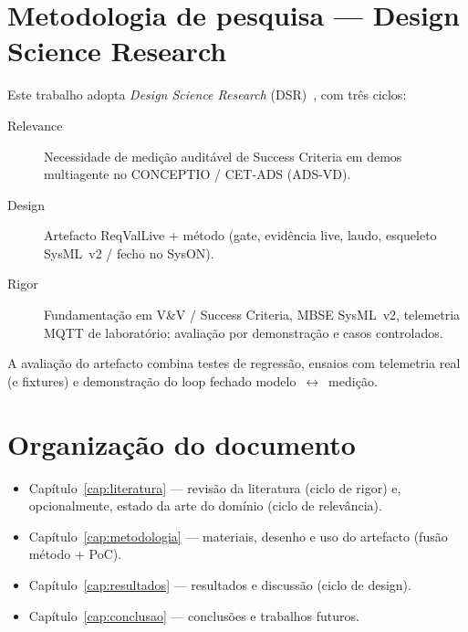 \section{Metodologia de pesquisa --- Design Science Research}
\label{sec:dsr}

Este trabalho adopta \emph{Design Science Research} (DSR)~\cite{hevner2004},
com três ciclos:

\begin{description}
  \item[Relevance] Necessidade de medição auditável de Success Criteria em demos
        multiagente no CONCEPTIO / CET-ADS (ADS-VD).
  \item[Design] Artefacto ReqValLive + método (gate, evidência live, laudo,
        esqueleto SysML~v2 / fecho no SysON).
  \item[Rigor] Fundamentação em V\&V / Success Criteria, MBSE SysML~v2, telemetria
        MQTT de laboratório; avaliação por demonstração e casos controlados.
\end{description}

A avaliação do artefacto combina testes de regressão, ensaios com telemetria
real (e fixtures) e demonstração do loop fechado modelo~$\leftrightarrow$~medição.

\section{Organização do documento}
\label{sec:estrutura}

\begin{itemize}
  \item Capítulo~\ref{cap:literatura} --- revisão da literatura (ciclo de rigor)
        e, opcionalmente, estado da arte do domínio (ciclo de relevância).
  \item Capítulo~\ref{cap:metodologia} --- materiais, desenho e uso do artefacto
        (fusão método + PoC).
  \item Capítulo~\ref{cap:resultados} --- resultados e discussão (ciclo de design).
  \item Capítulo~\ref{cap:conclusao} --- conclusões e trabalhos futuros.
\end{itemize}
